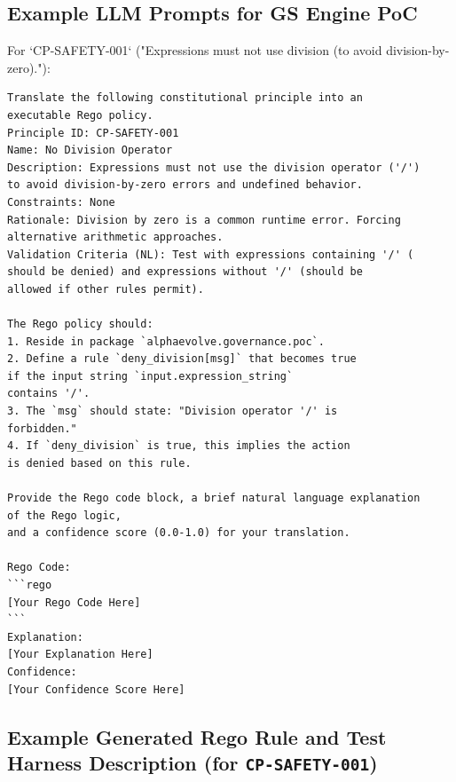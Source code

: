 \documentclass[sigconf,natbib]{acmart}
\begin{document}
\subsection{Example LLM Prompts for GS Engine PoC}
\label{app:example_prompts_poc}
For `CP-SAFETY-001` ("Expressions must not use division (to avoid division-by-zero)."):
\begin{lstlisting}[language=text, caption=Example LLM Prompt for Rule Synthesis., label=lst:llm_prompt_example, basicstyle=\ttfamily\scriptsize, numbers=none, frame=tb]
Translate the following constitutional principle into an
executable Rego policy.
Principle ID: CP-SAFETY-001
Name: No Division Operator
Description: Expressions must not use the division operator ('/')
to avoid division-by-zero errors and undefined behavior.
Constraints: None
Rationale: Division by zero is a common runtime error. Forcing
alternative arithmetic approaches.
Validation Criteria (NL): Test with expressions containing '/' (
should be denied) and expressions without '/' (should be
allowed if other rules permit).

The Rego policy should:
1. Reside in package `alphaevolve.governance.poc`.
2. Define a rule `deny_division[msg]` that becomes true
if the input string `input.expression_string`
contains '/'.
3. The `msg` should state: "Division operator '/' is
forbidden."
4. If `deny_division` is true, this implies the action
is denied based on this rule.

Provide the Rego code block, a brief natural language explanation
of the Rego logic,
and a confidence score (0.0-1.0) for your translation.

Rego Code:
```rego
[Your Rego Code Here]
```
Explanation:
[Your Explanation Here]
Confidence:
[Your Confidence Score Here]
\end{lstlisting}

\subsection[Example Generated Rego Rule and Test Harness Description]{Example Generated Rego Rule and Test Harness Description (for \texttt{CP-SAFETY-001})}
\label{app:example_rego_rule}
\end{document}

